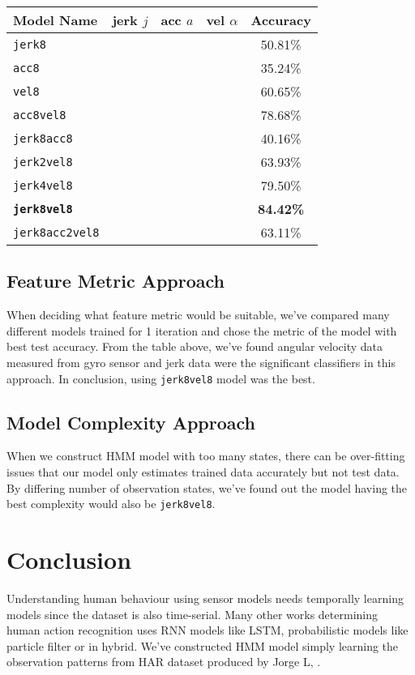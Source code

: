 \documentclass[10pt,twocolumn,letterpaper]{article}
\newcommand*\OK{\checkmark}
\newcommand*\BOLDOK{\ding{51}}
\begin{document}
{\centering
\begin{tabular}{ p{3cm}| ccc | c}
 \hline
 Model Name & jerk $j$ & acc $a$ & vel $\alpha$ & Accuracy \\
 \hline
 \texttt{jerk8} & \OK & & & 50.81\% \\
 \texttt{acc8} & & \OK & & 35.24\% \\
 \texttt{vel8} & & & \OK & 60.65\% \\
 \texttt{acc8vel8} & & \OK & \OK & 78.68\% \\
 \texttt{jerk8acc8} & \OK & \OK & & 40.16\% \\
 \texttt{jerk2vel8} & \OK & & \OK & 63.93\% \\
 \texttt{jerk4vel8} & \OK & & \OK & 79.50\% \\
 \texttt{\textbf{jerk8vel8}} & \BOLDOK & & \BOLDOK & \textbf{84.42\%} \\
 \texttt{jerk8acc2vel8} & \OK & \OK & \OK & 63.11\% \\
 \hline
\end{tabular}
}

\subsection{Feature Metric Approach}
When deciding what feature metric would be suitable, we've compared many different models trained for 1 iteration and chose the metric of the model with best test accuracy. From the table above, we've found angular velocity data measured from gyro sensor and jerk data were the significant classifiers in this approach. In conclusion, using \texttt{jerk8vel8} model was the best.

\subsection{Model Complexity Approach}
When we construct HMM model with too many states, there can be over-fitting issues that our model only estimates trained data accurately but not test data. By differing number of observation states, we've found out the model having the best complexity would also be \texttt{jerk8vel8}.

\section{Conclusion}
Understanding human behaviour using sensor models needs temporally learning models since the dataset is also time-serial. Many other works determining human action recognition uses RNN models like LSTM, probabilistic models like particle filter or in hybrid. We've constructed HMM model simply learning the observation patterns from HAR dataset produced by Jorge L, \etal.
\end{document}
